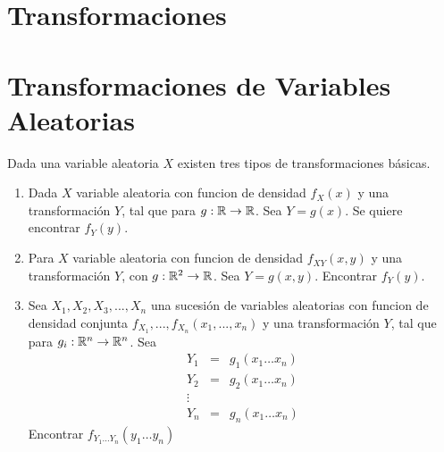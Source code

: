 %
%
\section{Transformaciones}

%
\section{Transformaciones de Variables Aleatorias}
Dada una variable aleatoria $X$ existen tres tipos de transformaciones b\'asicas.
\begin{enumerate}
\item Dada $X$ variable aleatoria con funcion de densidad $f_{X}\left(x\right)$ y una transformaci\'on $Y$, tal que para $g:\mathbb{R}\rightarrow\mathbb{R}$. Sea $Y=g\left(x\right)$. Se quiere encontrar $f_{Y}\left(y\right)$.
\item Para $X$ variable aleatoria con funcion de densidad $f_{XY}\left(x,y\right)$ y una transformaci\'on $Y$, con $g:\mathbb{R}^2\rightarrow\mathbb{R}$. Sea $Y=g\left(x,y\right)$. Encontrar $f_{Y}\left(y\right)$.
\item Sea $X_{1}, X_{2}, X_{3},..., X_{n}$ una sucesi\'on de variables aleatorias con funcion de densidad conjunta $f_{X_{1}},...,f_{X_{n}} \left(x_{1},...,x_{n}\right)$ y una transformaci\'on $Y$, tal que para $g_{i}:\mathbb{R}^n\rightarrow\mathbb{R}^n$. Sea 
\begin{eqnarray*}
Y_{1}&=&g_{1}\left(x_{1}\ldots x_{n}\right) \\ 
Y_{2}&=&g_{2}\left(x_{1}\ldots x_{n}\right)\\ 
\vdots \\ 
Y_{n}&=&g_{n}\left(x_{1}\ldots x_{n}\right)
\end{eqnarray*}
Encontrar $f_{Y_{1}\ldots Y_{n}}\left(y_{1} \ldots y_{n}\right)$
\end{enumerate}
